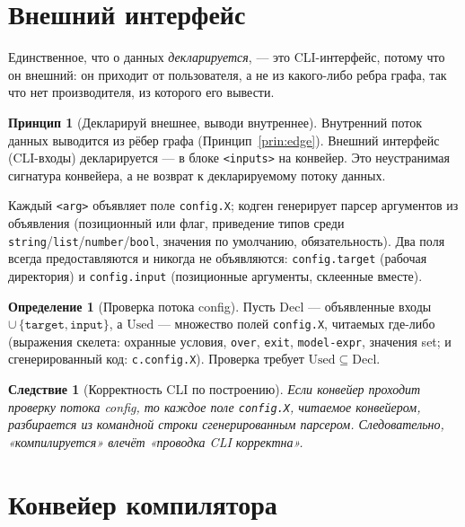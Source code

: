 \documentclass[11pt]{article}
\theoremstyle{plain}
\newtheorem{corollary}[theorem]{Следствие}
\theoremstyle{definition}
\newtheorem{definition}[theorem]{Определение}
\newtheorem{principle}[theorem]{Принцип}
\theoremstyle{remark}
\newcommand{\code}[1]{\texttt{#1}}
\newcommand{\state}[1]{\textsf{#1}}
\begin{document}
\section{Внешний интерфейс}\label{sec:inputs}

Единственное, что о данных \emph{декларируется}, --- это CLI-интерфейс, потому что он
внешний: он приходит от пользователя, а не из какого-либо ребра графа, так что нет
производителя, из которого его вывести.

\begin{principle}[Декларируй внешнее, выводи внутреннее]\label{prin:law}
Внутренний поток данных выводится из рёбер графа (Принцип~\ref{prin:edge}). Внешний
интерфейс (CLI-входы) декларируется --- в блоке \code{<inputs>} на конвейер. Это
неустранимая сигнатура конвейера, а не возврат к декларируемому потоку данных.
\end{principle}

Каждый \code{<arg>} объявляет поле \code{config.X}; кодген генерирует парсер аргументов из
объявления (позиционный или флаг, приведение типов среди
\code{string}/\code{list}/\code{number}/\code{bool}, значения по умолчанию,
обязательность). Два поля всегда предоставляются и никогда не объявляются:
\code{config.target} (рабочая директория) и \code{config.input} (позиционные аргументы,
склеенные вместе).

\begin{definition}[Проверка потока config]
Пусть $\mathrm{Decl}$ --- объявленные входы $\cup\, \{\code{target}, \code{input}\}$, а
$\mathrm{Used}$ --- множество полей \code{config.X}, читаемых где-либо (выражения скелета:
охранные условия, \code{over}, \code{exit}, \code{model-expr}, значения \state{set}; и
сгенерированный код: \code{c.config.X}). Проверка требует $\mathrm{Used} \subseteq
\mathrm{Decl}$.
\end{definition}

\begin{corollary}[Корректность CLI по построению]
Если конвейер проходит проверку потока config, то каждое поле \code{config.X}, читаемое
конвейером, разбирается из командной строки сгенерированным парсером. Следовательно,
«компилируется» влечёт «проводка CLI корректна».
\end{corollary}

\section{Конвейер компилятора}\label{sec:compiler}
\end{document}
